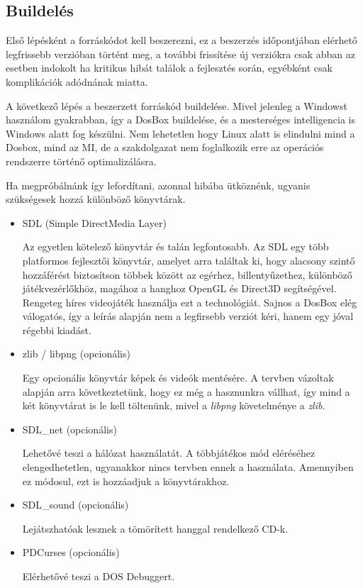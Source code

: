 
\subsection{Buildelés}
Első lépésként a forráskódot kell beszerezni, ez a beszerzés időpontjában elérhető legfrissebb verzióban történt meg, a további frissítése új verziókra csak abban az esetben indokolt ha kritikus hibát találok a fejlesztés során, egyébként csak komplikációk adódnának miatta.

A következő lépés a beszerzett forráskód buildelése. Mivel jelenleg a Windowst használom gyakrabban, így a DosBox buildelése, és a mesterséges intelligencia is Windows alatt fog készülni. Nem lehetetlen hogy Linux alatt is elindulni mind a Dosbox, mind az MI, de a szakdolgazat nem foglalkozik erre az operációs rendszerre történő optimalizálásra.

Ha megpróbálnánk így lefordítani, azonnal hibába ütköznénk, ugyanis szükségesek hozzá különböző könyvtárak.

\begin{itemize}

    \item SDL (Simple DirectMedia Layer)
    
    Az egyetlen kötelező könyvtár és talán legfontosabb. Az SDL egy több platformos fejlesztői könyvtár, amelyet arra találtak ki, hogy alacsony szintő hozzáférést biztosítson többek között az egérhez, billentyűzethez, különböző játékvezérlőkhöz, magához a hanghoz OpenGL és Direct3D segítségével. Rengeteg híres videojáték használja ezt a technológiát. Sajnos a DosBox elég válogatós, így a leírás alapján nem a legfirsebb verziót kéri, hanem egy jóval régebbi kiadást.
    \item zlib / libpng (opcionális)
    
    Egy opcionális könyvtár képek és videók mentésére. A tervben vázoltak alapján arra következtetünk, hogy ez még a hasznunkra vállhat, így mind a két könyvtárat is le kell töltenünk, mivel a \textit{libpng} követelménye a \textit{zlib}. 
    \item SDL\_net (opcionális)
    
    Lehetővé teszi a hálózat használatát. A többjátékos mód eléréséhez elengedhetetlen, ugyanakkor nincs tervben ennek a használata. Amennyiben ez módosul, ezt is hozzáadjuk a könyvtárakhoz.
    \item SDL\_sound (opcionális)
    
    Lejátszhatóak lesznek a tömörített hanggal rendelkező CD-k.
    \item PDCurses (opcionális)
    
    Elérhetővé teszi a DOS Debuggert.

\end{itemize}

